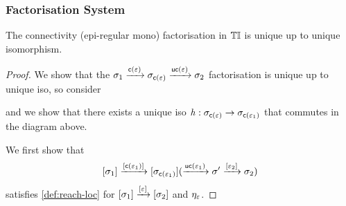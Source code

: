 \subsubsection{Factorisation System}\label{sec:fact-tinstC}

\begin{lemma}\label{lem:fact-uniq-tinstC}
    The connectivity (epi-regular mono) factorisation in ${\mathbb{T}\mathbb{I}}$ is unique up to unique isomorphism.
\end{lemma}
\begin{proof}
    We show that the $\sigma_1 \xrightarrow{\mathsf{c}(\varepsilon)} \sigma_{\mathsf{c}(\varepsilon)} \xrightarrow{\mathsf{uc}(\varepsilon)} \sigma_2$ factorisation is unique up to unique iso, 
    so consider 
    \begin{center}
    \end{center}
    and we show that there exists a unique iso $\mathit{h} : \sigma_{\mathsf{c}(\varepsilon)} \to \sigma_{\mathsf{c}(\varepsilon_1)}$ that commutes in the diagram above.

    We first show that 
    \[ [\sigma_1] \xrightarrow{[\mathsf{c}(\varepsilon_1)]} [\sigma_{\mathsf{c}(\varepsilon_1)}] (\xrightarrow{\mathsf{uc}(\varepsilon_1)} \sigma' \xrightarrow{[\varepsilon_2]} \sigma_2) \]
    satisfies \cref{def:reach-loc} for $[\sigma_1] \xrightarrow{[\varepsilon]} [\sigma_2]$ and $\eta_\varepsilon$.


\end{proof}
